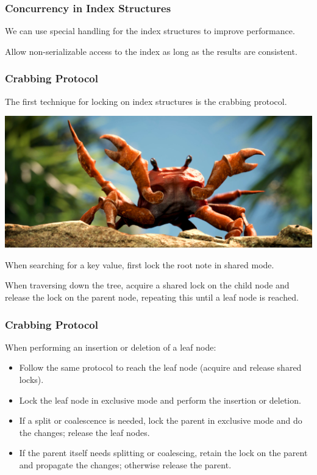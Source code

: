 \begin{frame}
\frametitle{Concurrency in Index Structures}

We can use special handling for the index structures to improve performance. 

Allow non-serializable access to the index as long as the results are consistent. 


\end{frame}

\begin{frame}
\frametitle{Crabbing Protocol}

The first technique for locking on index structures is the \alert{crabbing protocol}.

\begin{center}
	\includegraphics[width=0.4 \textwidth]{images/crab.jpg}
\end{center}

When searching for a key value, first lock the root note in shared mode. 

When traversing down the tree, acquire a shared lock on the child node and release the lock on the parent node, repeating this until a leaf node is reached.

\end{frame}

\begin{frame}
\frametitle{Crabbing Protocol}


When performing an insertion or deletion of a leaf node:
\begin{itemize}
	\item Follow the same protocol to reach the leaf node (acquire and release shared locks).
	\item Lock the leaf node in exclusive mode and perform the insertion or deletion.
	\item If a split or coalescence is needed, lock the parent in exclusive mode and do the changes; release the leaf nodes.
	\item If the parent itself needs splitting or coalescing, retain the lock on the parent and propagate the changes; otherwise release the parent.
\end{itemize}


\end{frame}

